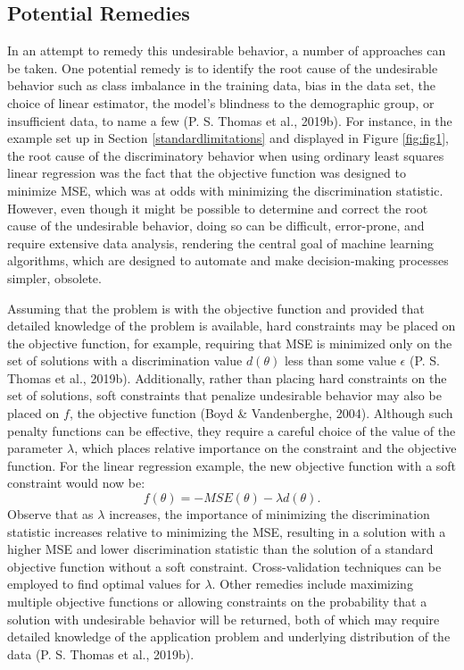 \documentclass[12pt, twoside]{amherstthesis}
\begin{document}
\hypertarget{potential-remedies}{%
\subsection{Potential Remedies}\label{potential-remedies}}

In an attempt to remedy this undesirable behavior, a number of approaches can be taken. One potential remedy is to identify the root cause of the undesirable behavior such as class imbalance in the training data, bias in the data set, the choice of linear estimator, the model's blindness to the demographic group, or insufficient data, to name a few (P. S. Thomas et al., 2019b). For instance, in the example set up in Section \ref{standardlimitations} and displayed in Figure \ref{fig:fig1}, the root cause of the discriminatory behavior when using ordinary least squares linear regression was the fact that the objective function was designed to minimize MSE, which was at odds with minimizing the discrimination statistic. However, even though it might be possible to determine and correct the root cause of the undesirable behavior, doing so can be difficult, error-prone, and require extensive data analysis, rendering the central goal of machine learning algorithms, which are designed to automate and make decision-making processes simpler, obsolete.

Assuming that the problem is with the objective function and provided that detailed knowledge of the problem is available, hard constraints may be placed on the objective function, for example, requiring that MSE is minimized only on the set of solutions with a discrimination value \(d(\theta)\) less than some value \(\epsilon\) (P. S. Thomas et al., 2019b). Additionally, rather than placing hard constraints on the set of solutions, soft constraints that penalize undesirable behavior may also be placed on \(f\), the objective function (Boyd \& Vandenberghe, 2004). Although such penalty functions can be effective, they require a careful choice of the value of the parameter \(\lambda\), which places relative importance on the constraint and the objective function. For the linear regression example, the new objective function with a soft constraint would now be:
\begin{equation}
\label{ch2eq5}
f(\theta) = - MSE (\theta) - \lambda d(\theta).
\end{equation}
Observe that as \(\lambda\) increases, the importance of minimizing the discrimination statistic increases relative to minimizing the MSE, resulting in a solution with a higher MSE and lower discrimination statistic than the solution of a standard objective function without a soft constraint. Cross-validation techniques can be employed to find optimal values for \(\lambda\). Other remedies include maximizing multiple objective functions or allowing constraints on the probability that a solution with undesirable behavior will be returned, both of which may require detailed knowledge of the application problem and underlying distribution of the data (P. S. Thomas et al., 2019b).
\end{document}
